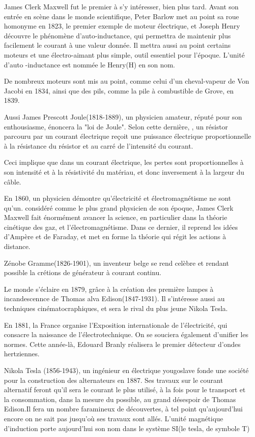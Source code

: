 \documentclass[12pt]{report}
\begin{document}
James Clerk Maxwell fut le premier à s'y intéresser, bien plus tard. Avant son entrée en scène dans le monde scientifique, Peter Barlow met au point sa roue homonyme en 1823, le premier exemple de moteur électrique, et Joseph Henry découvre le phénomène d'auto-inductance, qui permettra de maintenir plus facilement le courant à une valeur donnée. Il mettra aussi au point certains moteurs et une électro-aimant plus simple, outil essentiel pour l'époque.
L'unité d'auto -inductance est nommée le Henry(H) en son nom.

  De nombreux moteurs sont mis au point, comme celui d'un cheval-vapeur de Von Jacobi en 1834, ainsi que des pils, comme la pile à combustible de Grove, en 1839.
  
Aussi James Prescott Joule(1818-1889), un physicien amateur, réputé pour son enthousiasme, énoncera la "loi de Joule". Selon cette dernière, , un résistor parcouru par un courant électrique reçoit une puissance électrique proportionnelle à la résistance du résistor et au carré de l'intensité du courant. 

Ceci implique que dans un courant électrique, les pertes sont proportionnelles à son intensité et à la résistivité du matériau, et donc inversement à la largeur du câble.

En 1860, un physicien démontre qu'électricité et électromagnétisme ne sont qu'un. considéré comme le plus grand physicien de son époque, James Clerk Maxwell fait énormément avancer la science, en particulier dans la théorie cinétique des gaz, et l'électromagnétisme. Dans ce dernier, il reprend les idées d'Ampère et de Faraday, et met en forme la théorie qui régit les actions à distance.

Zénobe Gramme(1826-1901), un inventeur belge se rend celèbre et rendant possible la crétions de générateur à courant continu.

Le monde s'éclaire en 1879, grâce à la création des première lampes à incandescennce de Thomas alva Edison(1847-1931). Il s'intéresse aussi au techniques cinématocraphiques, et sera le rival du plus jeune Nikola Tesla.

En 1881, la France organise l'Exposition internationale de l'électricité, qui consacre la naissance de l'électrotechnique. On se souciera également d'unifier les normes. Cette année-là, Edouard Branly réalisera le premier détecteur d'ondes hertziennes.

Nikola Tesla (1856-1943), un ingénieur en électrique yougoslave fonde une société pour la construction des alternateurs en 1887. Ses travaux sur le courant alternatif feront qu'il sera le courant le plus utilisé, à la fois pour le transport et la consommation, dans la mesure du possible, au grand désespoir de Thomas Edison.Il fera un nombre faramineux de découvertes, à tel point qu'aujourd'hui encore on ne sait pas jusqu'où ses travaux sont allés. L'unité magnétique d'induction porte aujourd'hui son nom dans le système SI(le tesla, de symbole T)
\end{document}
